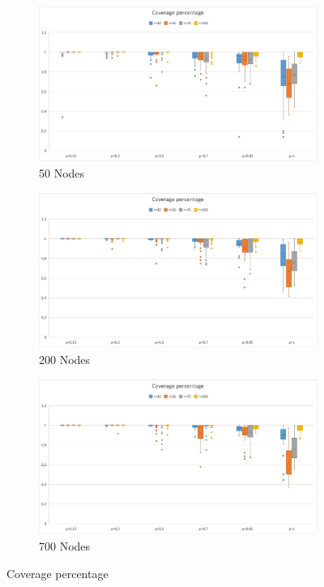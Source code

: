 \begin{figure}
\begin{subfigure}{0.35\hsize}\centering
    \includegraphics[width=1\hsize]{./images/Rate50Boxplot.png}
\caption{50 Nodes}  
\end{subfigure}%
\begin{subfigure}{0.35\hsize}\centering
    \includegraphics[width=1\hsize]{./images/Rate200Boxplot.png}
\caption{200 Nodes}
    
\end{subfigure}
\begin{subfigure}{0.35\hsize}\centering
    \includegraphics[width=1\hsize]{./images/Rate700Boxplot.png}
\caption{700 Nodes}
    
\end{subfigure}
\caption{Coverage percentage}
\label{fig:CovPercBoxplotNodes} 
\end{figure}


